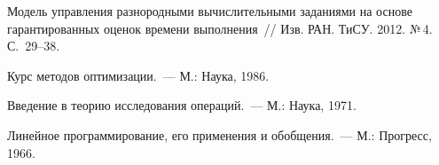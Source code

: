 \begin{multicols}{2}
{{\begin{thebibliography}{99}
  
Модель управления разнородными вычислительными заданиями на основе 
гарантированных оценок времени выполнения~// Изв. РАН. ТиСУ. 2012. №\,4. С.~29--38.


  Курс методов оптимизации.~--- М.: Наука, 1986.

  Введение в теорию исследования операций.~--- М.: Наука, 1971.



\label{end\stat}

  Линейное программирование, его применения и обобщения.~--- М.: Прогресс, 1966.
\end{thebibliography}
}
}

\end{multicols}